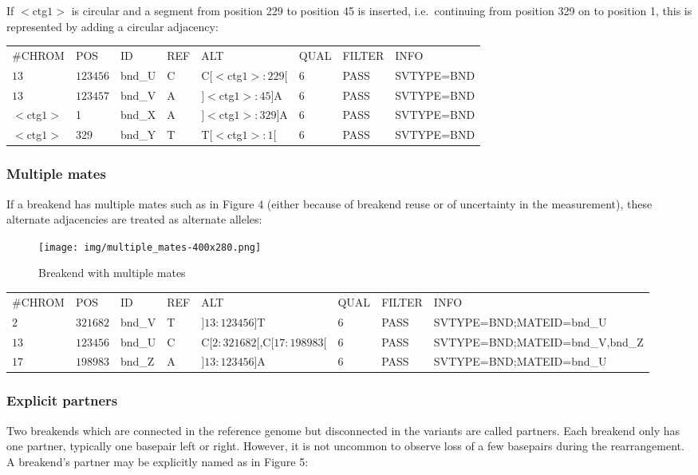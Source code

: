 \documentclass[8pt]{article}
\begin{document}
If $<$ctg$1>$ is circular and a segment from position 229 to position 45 is inserted, i.e.\ continuing from position 329 on to position 1, this is represented by adding a circular adjacency:

\vspace{0.3cm}
\small
\begin{tabular}{ l l l l l l l l }
\#CHROM & POS & ID & REF & ALT & QUAL & FILTER & INFO \\
$13$ & $123456$ & bnd\_U & C & C$[<$ctg$1>:229[$ & 6 & PASS & SVTYPE=BND \\
$13$ & $123457$ & bnd\_V & A & $]<$ctg$1>:45]$A & 6 & PASS & SVTYPE=BND \\
$<$ctg$1>$ & 1 & bnd\_X & A & $]<$ctg$1>:329]$A & 6 & PASS & SVTYPE=BND \\
$<$ctg$1>$ & 329 & bnd\_Y & T & T$[<$ctg$1>:1[$ & 6 & PASS & SVTYPE=BND \\
\end{tabular}
\normalsize

\subsubsection{Multiple mates}
If a breakend has multiple mates such as in Figure 4 (either because of breakend reuse or of uncertainty in the measurement), these alternate adjacencies are treated as alternate alleles:

\begin{figure}[h]
\centering
\texttt{[image: img/multiple\_mates-400x280.png]}
\caption{Breakend with multiple mates}
\end{figure}

\footnotesize
\begin{tabular}{ l l l l l l l l }
\#CHROM & POS & ID & REF & ALT & QUAL & FILTER & INFO \\
$2$ & $321682$ & bnd\_V & T & $]13:123456]$T & 6 & PASS & SVTYPE=BND;MATEID=bnd\_U \\
$13$ & $123456$ & bnd\_U & C & C$[2:321682[$,C$[17:198983[$ & 6 & PASS & SVTYPE=BND;MATEID=bnd\_V,bnd\_Z \\
$17$ & $198983$ & bnd\_Z & A & $]13:123456]$A & 6 & PASS & SVTYPE=BND;MATEID=bnd\_U \\
\end{tabular}
\normalsize

\subsubsection{Explicit partners}
Two breakends which are connected in the reference genome but disconnected in the variants are called partners.
Each breakend only has one partner, typically one basepair left or right.
However, it is not uncommon to observe loss of a few basepairs during the rearrangement.
A breakend's partner may be explicitly named as in Figure 5:
\end{document}
